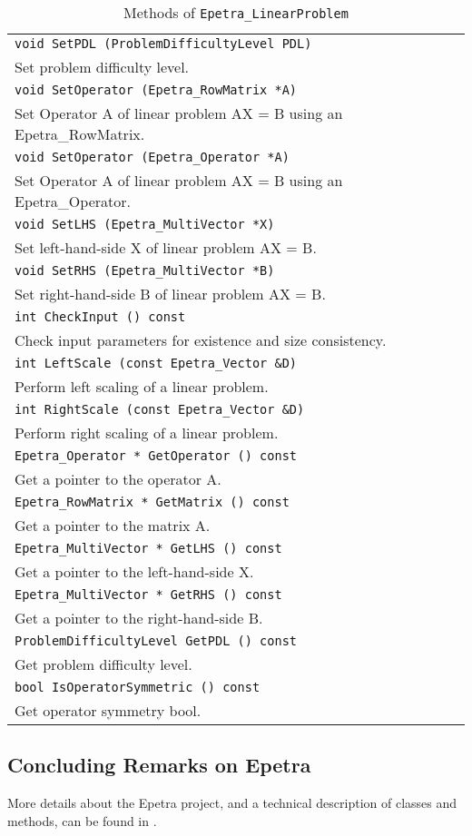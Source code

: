 \begin{table}
\begin{center}
\begin{tabular}{ | p{15cm} | }
\hline
\tt void 
SetPDL (ProblemDifficultyLevel PDL) \\
Set problem difficulty level.  \\
\tt void 
SetOperator (Epetra\_RowMatrix *A) \\
Set Operator A of linear problem AX = B using an Epetra\_RowMatrix.  \\
\tt void 
SetOperator (Epetra\_Operator *A) \\
Set Operator A of linear problem AX = B using an Epetra\_Operator.  \\
\tt void 
SetLHS (Epetra\_MultiVector *X) \\
Set left-hand-side X of linear problem AX = B. \\
\tt void 
SetRHS (Epetra\_MultiVector *B) \\
Set right-hand-side B of linear problem AX = B.  \\
\tt int 
CheckInput () const \\
Check input parameters for existence and size consistency. \\
\tt int  
LeftScale (const Epetra\_Vector \&D) \\
Perform left scaling of a linear problem.  \\
\tt int 
RightScale (const Epetra\_Vector \&D) \\
Perform right scaling of a linear problem. \\
\tt Epetra\_Operator * 
GetOperator () const\\
Get a pointer to the operator A. \\
\tt Epetra\_RowMatrix * 
GetMatrix () const \\
Get a pointer to the matrix A. \\
\tt Epetra\_MultiVector * 
GetLHS () const \\
Get a pointer to the left-hand-side X. \\
\tt Epetra\_MultiVector * 
GetRHS () const \\
Get a pointer to the right-hand-side B. \\
\tt ProblemDifficultyLevel 
GetPDL () const \\
Get problem difficulty level. \\
\tt bool 
IsOperatorSymmetric () const \\
Get operator symmetry bool. \\
\hline
\end{tabular}
\caption{Methods of {\tt Epetra\_LinearProblem}}
\label{tab:distr_vec}
\end{center}
\end{table}






\subsection{Concluding Remarks on Epetra}
\label{sec:epetra_concluding}

More details about the Epetra project, and a technical description of
classes and methods, can be found in
\cite{Epetra-Ref-Guide,Epetra-Users-Guide}.

